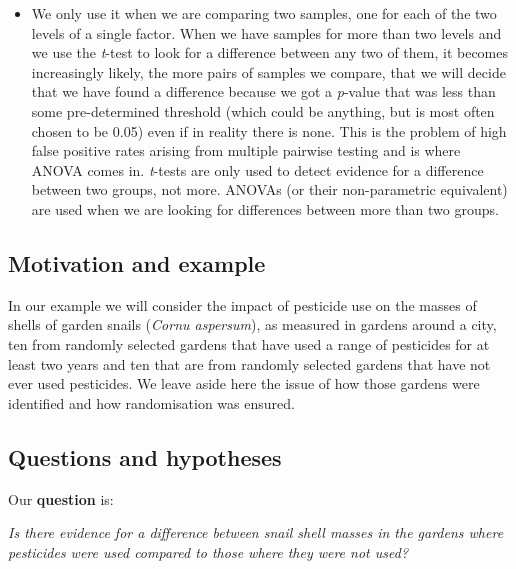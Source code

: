 \documentclass[
  letterpaper,
  DIV=11,
  numbers=noendperiod]{scrreprt}
\begin{document}
\begin{itemize}
  the data, so in principle you need to check that this is at least
  \emph{approximately} the case, or have reason to suppose that it
  should be. \emph{However}, in an actual \emph{t}-test done using R,
  the Welch variant of the \emph{t}-test is carried out by default. This
  works even when the variances of the two sets are different, so in
  practice it is possible to ignore this equal variance requirement.
\item
  We only use it when we are comparing two samples, one for each of the
  two levels of a single factor. When we have samples for more than two
  levels and we use the \emph{t}-test to look for a difference between
  any two of them, it becomes increasingly likely, the more pairs of
  samples we compare, that we will decide that we have found a
  difference because we got a \emph{p}-value that was less than some
  pre-determined threshold (which could be anything, but is most often
  chosen to be 0.05) even if in reality there is none. This is the
  problem of high false positive rates arising from multiple pairwise
  testing and is where ANOVA comes in. \emph{t}-tests are only used to
  detect evidence for a difference between two groups, not more. ANOVAs
  (or their non-parametric equivalent) are used when we are looking for
  differences between more than two groups.
\end{itemize}

\subsection{Motivation and example}\label{motivation-and-example}

In our example we will consider the impact of pesticide use on the
masses of shells of garden snails (\emph{Cornu aspersum}), as measured
in gardens around a city, ten from randomly selected gardens that have
used a range of pesticides for at least two years and ten that are from
randomly selected gardens that have not ever used pesticides. We leave
aside here the issue of how those gardens were identified and how
randomisation was ensured.

\subsection{Questions and hypotheses}\label{questions-and-hypotheses}

Our \textbf{question} is:

\emph{Is there evidence for a difference between snail shell masses in
the gardens where pesticides were used compared to those where they were
not used?}
\end{document}
